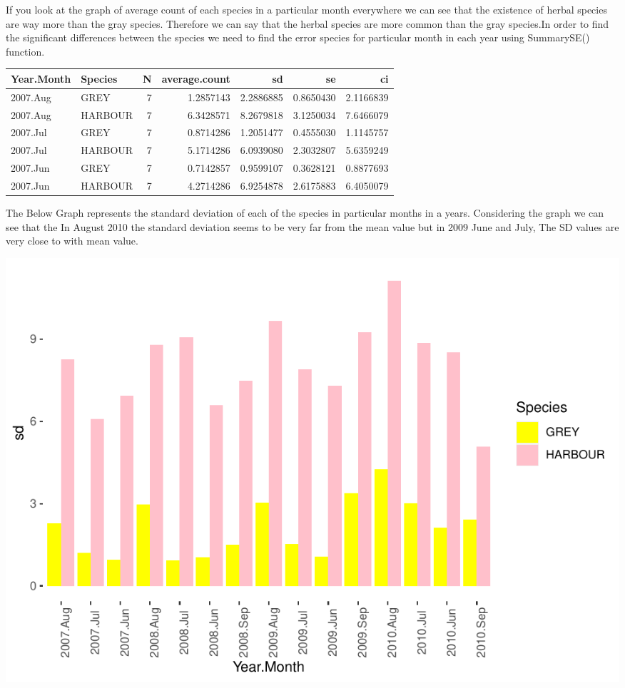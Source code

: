 \documentclass[
]{article}
\begin{document}
If you look at the graph of average count of each species in a
particular month everywhere we can see that the existence of herbal
species are way more than the gray species. Therefore we can say that
the herbal species are more common than the gray species.In order to
find the significant differences between the species we need to find the
error species for particular month in each year using SummarySE()
function.

\begin{longtable}[]{@{}llrrrrr@{}}
\toprule
Year.Month & Species & N & average.count & sd & se & ci\tabularnewline
\midrule
\endhead
2007.Aug & GREY & 7 & 1.2857143 & 2.2886885 & 0.8650430 &
2.1166839\tabularnewline
2007.Aug & HARBOUR & 7 & 6.3428571 & 8.2679818 & 3.1250034 &
7.6466079\tabularnewline
2007.Jul & GREY & 7 & 0.8714286 & 1.2051477 & 0.4555030 &
1.1145757\tabularnewline
2007.Jul & HARBOUR & 7 & 5.1714286 & 6.0939080 & 2.3032807 &
5.6359249\tabularnewline
2007.Jun & GREY & 7 & 0.7142857 & 0.9599107 & 0.3628121 &
0.8877693\tabularnewline
2007.Jun & HARBOUR & 7 & 4.2714286 & 6.9254878 & 2.6175883 &
6.4050079\tabularnewline
\bottomrule
\end{longtable}

The Below Graph represents the standard deviation of each of the species
in particular months in a years. Considering the graph we can see that
the In August 2010 the standard deviation seems to be very far from the
mean value but in 2009 June and July, The SD values are very close to
with mean value.

\includegraphics{Statistical-analysis-in-RStudio_files/figure-latex/unnamed-chunk-33-1.pdf}
\end{document}

